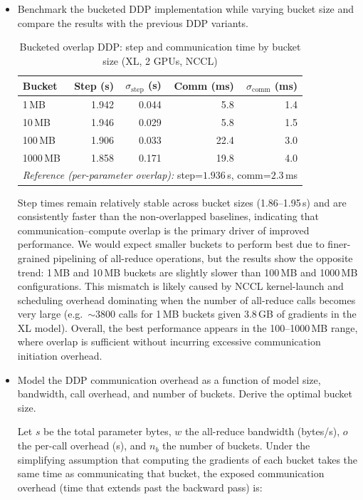 \documentclass[letterpaper]{article}
\begin{document}
	\begin{itemize}
		\item[(a)] Benchmark the bucketed DDP implementation while varying bucket size and compare the results with the previous DDP variants.
		
		\begin{table}[H]
			\centering
			\caption{Bucketed overlap DDP: step and communication time by bucket size (XL, 2 GPUs, NCCL)}
			\label{tab:bucketed-ddp}
			\begin{tabular}{lrrrr}
				\hline
				Bucket & Step (s) & $\sigma_{\text{step}}$ (s) & Comm (ms) & $\sigma_{\text{comm}}$ (ms) \\
				\hline
				1\,MB    & 1.942 & 0.044 &  5.8  & 1.4 \\
				10\,MB   & 1.946 & 0.029 &  5.8  & 1.5 \\
				100\,MB  & 1.906 & 0.033 & 22.4  & 3.0 \\
				1000\,MB & 1.858 & 0.171 & 19.8  & 4.0 \\
				\hline
				\multicolumn{5}{l}{\emph{Reference (per-parameter overlap):} step=$1.936$\,s, comm=$2.3$\,ms} \\
				\hline
			\end{tabular}
		\end{table}
		
		Step times remain relatively stable across bucket sizes (1.86--1.95\,s) and are consistently faster than the non-overlapped baselines, indicating that communication--compute overlap is the primary driver of improved performance. We would expect smaller buckets to perform best due to finer-grained pipelining of all-reduce operations, but the results show the opposite trend: 1\,MB and 10\,MB buckets are slightly slower than 100\,MB and 1000\,MB configurations. This mismatch is likely caused by NCCL kernel-launch and scheduling overhead dominating when the number of all-reduce calls becomes very large (e.g.\ $\sim$3800 calls for 1\,MB buckets given 3.8\,GB of gradients in the XL model). Overall, the best performance appears in the 100--1000\,MB range, where overlap is sufficient without incurring excessive communication initiation overhead.
		
		\item[(b)] Model the DDP communication overhead as a function of model size, bandwidth, call overhead, and number of buckets. Derive the optimal bucket size.
		
		Let $s$ be the total parameter bytes, $w$ the all-reduce bandwidth (bytes/s), $o$ the per-call overhead (s), and $n_b$ the number of buckets.
		Under the simplifying assumption that computing the gradients of each bucket takes the same time as communicating that bucket, the exposed communication overhead (time that extends past the backward pass) is:
		

\end{itemize}
\end{document}
